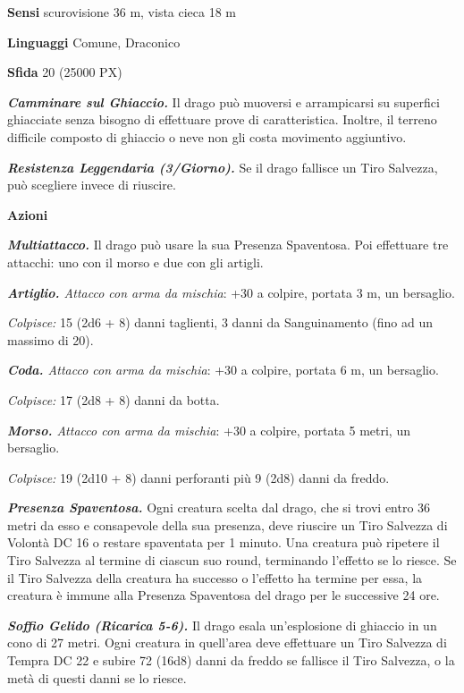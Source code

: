\begin{multicols}{2}
	\textbf{Sensi} scurovisione 36 m, vista cieca 18 m

	\textbf{Linguaggi} Comune, Draconico

	\textbf{Sfida} 20 (25000 PX)

	\textit{\textbf{Camminare sul Ghiaccio.}} Il drago può muoversi e arrampicarsi su superfici ghiacciate senza bisogno di effettuare prove di caratteristica. Inoltre, il terreno difficile composto di ghiaccio o neve non gli costa movimento aggiuntivo.

	\textit{\textbf{Resistenza Leggendaria (3/Giorno).}} Se il drago fallisce un Tiro Salvezza, può scegliere invece di riuscire.

	\textbf{Azioni}

	\textit{\textbf{Multiattacco.}} Il drago può usare la sua Presenza Spaventosa. Poi effettuare tre attacchi: uno con il morso e due con gli artigli.

	\textit{\textbf{Artiglio.} Attacco con arma da mischia}: +30 a colpire, portata 3 m, un bersaglio.

	\textit{Colpisce:} 15 (2d6 + 8) danni taglienti, 3 danni da Sanguinamento (fino ad un massimo di 20).

	\textit{\textbf{Coda.} Attacco con arma da mischia}: +30 a colpire, portata 6 m, un bersaglio.

	\textit{Colpisce:} 17 (2d8 + 8) danni da botta.

	\textit{\textbf{Morso.} Attacco con arma da mischia}: +30 a colpire, portata 5 metri, un bersaglio.

	\textit{Colpisce:} 19 (2d10 + 8) danni perforanti più 9 (2d8) danni da freddo.

	\textit{\textbf{Presenza Spaventosa.}} Ogni creatura scelta dal drago, che si trovi entro 36 metri da esso e consapevole della sua presenza, deve riuscire un Tiro Salvezza di Volontà DC 16 o restare spaventata per 1 minuto. Una creatura può ripetere il Tiro Salvezza al termine di ciascun suo round, terminando l'effetto se lo riesce. Se il Tiro Salvezza della creatura ha successo o l'effetto ha termine per essa, la creatura è immune alla Presenza Spaventosa del drago per le successive 24 ore.

	\textit{\textbf{Soffio Gelido (Ricarica 5-6).}} Il drago esala un'esplosione di ghiaccio in un cono di 27 metri. Ogni creatura in quell'area deve effettuare un Tiro Salvezza di Tempra DC 22 e subire 72 (16d8) danni da freddo se fallisce il Tiro Salvezza, o la metà di questi danni se lo riesce.


\end{multicols}

